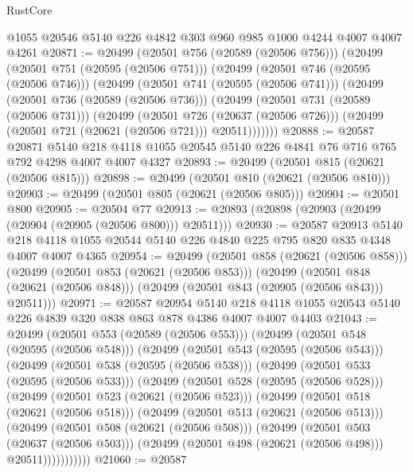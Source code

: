 \begin{lexlean}{RustCore}
\begin{coremodule}
    @1055
    @20546
    @5140
    @226
    @4842
    @303
    @960
    @985
    @1000
    @4244
    @4007
    @4007
    @4261
@20871 := @20499
    (@20501 @756 (@20589 (@20506 @756)))
    (@20499
      (@20501 @751 (@20595 (@20506 @751)))
      (@20499
        (@20501 @746 (@20595 (@20506 @746)))
        (@20499
          (@20501 @741 (@20595 (@20506 @741)))
          (@20499
            (@20501 @736 (@20589 (@20506 @736)))
            (@20499
              (@20501 @731 (@20589 (@20506 @731)))
              (@20499
                (@20501 @726 (@20637 (@20506 @726)))
                (@20499 (@20501 @721 (@20621 (@20506 @721))) @20511)))))))
@20888 := @20587
    @20871
    @5140
    @218
    @4118
    @1055
    @20545
    @5140
    @226
    @4841
    @76
    @716
    @765
    @792
    @4298
    @4007
    @4007
    @4327
@20893 := @20499 (@20501 @815 (@20621 (@20506 @815)))
@20898 := @20499 (@20501 @810 (@20621 (@20506 @810)))
@20903 := @20499 (@20501 @805 (@20621 (@20506 @805)))
@20904 := @20501 @800
@20905 := @20504 @77
@20913 := @20893 (@20898 (@20903 (@20499 (@20904 (@20905 (@20506 @800))) @20511)))
@20930 := @20587
    @20913
    @5140
    @218
    @4118
    @1055
    @20544
    @5140
    @226
    @4840
    @225
    @795
    @820
    @835
    @4348
    @4007
    @4007
    @4365
@20954 := @20499
    (@20501 @858 (@20621 (@20506 @858)))
    (@20499
      (@20501 @853 (@20621 (@20506 @853)))
      (@20499
        (@20501 @848 (@20621 (@20506 @848)))
        (@20499 (@20501 @843 (@20905 (@20506 @843))) @20511)))
@20971 := @20587
    @20954
    @5140
    @218
    @4118
    @1055
    @20543
    @5140
    @226
    @4839
    @320
    @838
    @863
    @878
    @4386
    @4007
    @4007
    @4403
@21043 := @20499
    (@20501 @553 (@20589 (@20506 @553)))
    (@20499
      (@20501 @548 (@20595 (@20506 @548)))
      (@20499
        (@20501 @543 (@20595 (@20506 @543)))
        (@20499
          (@20501 @538 (@20595 (@20506 @538)))
          (@20499
            (@20501 @533 (@20595 (@20506 @533)))
            (@20499
              (@20501 @528 (@20595 (@20506 @528)))
              (@20499
                (@20501 @523 (@20621 (@20506 @523)))
                (@20499
                  (@20501 @518 (@20621 (@20506 @518)))
                  (@20499
                    (@20501 @513 (@20621 (@20506 @513)))
                    (@20499
                      (@20501 @508 (@20621 (@20506 @508)))
                      (@20499
                        (@20501 @503 (@20637 (@20506 @503)))
                        (@20499 (@20501 @498 (@20621 (@20506 @498))) @20511)))))))))))
@21060 := @20587

\end{coremodule}
\end{lexlean}
